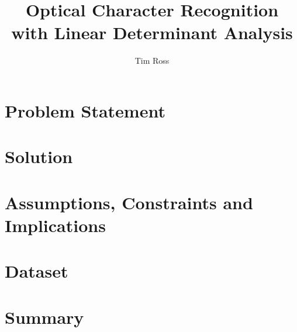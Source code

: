 \documentclass[12pt]{article}
\title{Optical Character Recognition with Linear Determinant Analysis}
\author{Tim Ross}
\begin{document}
  \maketitle

\section{Problem Statement}


\section{Solution}



\section{Assumptions, Constraints and Implications}



\section{ Dataset}


\section{ Summary}


  \printbibliography
\end{document}
